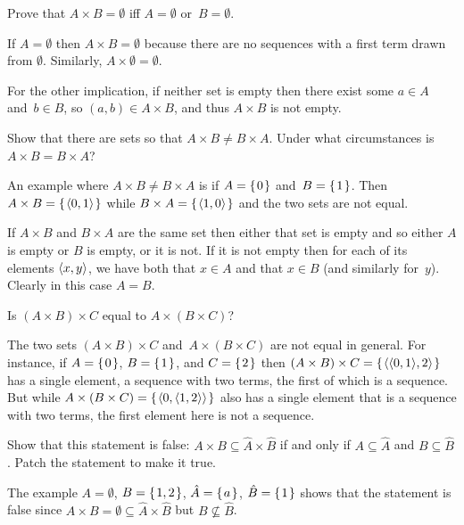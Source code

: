 \documentclass{ibl}  %
\begin{document}
\begin{problem} 
\begin{exes}
\begin{exercise} 
  Prove that $A\times B=\emptyset$ iff $A=\emptyset$ or~$B=\emptyset$.
\end{exercise}
\begin{answer}
  If $A=\emptyset$ then $A\times B=\emptyset$ because there are no 
  sequences with a first term drawn from $\emptyset$.
  Similarly, $A\times\emptyset=\emptyset$.
 
  For the other implication, 
  if neither set is empty then there exist some $a\in A$ and~$b\in B$, so 
  $(a,b)\in A\times B$, and thus $A\times B$ is not empty.  
\end{answer}
\begin{exercise} 
  Show that there are sets so that $A\times B\neq B\times A$.
  Under what circumstances is $A\times B=B\times A$?
\end{exercise}
\begin{answer}
  An example where $A\times B\neq B\times A$ is if 
  $A=\mbox{$\{\hspace{0.1em}0\hspace{0.1em}\}$}$ and~$B=\mbox{$\{\hspace{0.1em}1\hspace{0.1em}\}$}$.
  Then $A\times B=\mbox{$\{\hspace{0.1em}\langle0,1\rangle\hspace{0.1em}\}$}$ while
  $B\times A=\mbox{$\{\hspace{0.1em}\langle1,0\rangle\hspace{0.1em}\}$}$ and the two sets are not equal.

  If $A\times B$ and $B\times A$ are the same set then either that set is empty 
  and so either $A$ is empty or $B$ is empty,
  or it is not.
  If it is not empty then for each of its elements $\langle x,y\rangle$,
  we have both that $x\in A$ and that $x\in B$ (and similarly for~$y$).
  Clearly in this case $A=B$.  
\end{answer}
\begin{exercise} 
  Is $(A\times B)\times C$ equal to $A\times (B\times C)$?
\end{exercise}
\begin{answer}
  The two sets $(A\times B)\times C$ and~$A\times (B\times C)$ 
  are not equal in general.
  For instance, if $A=\mbox{$\{\hspace{0.1em}0\hspace{0.1em}\}$}$, $B=\mbox{$\{\hspace{0.1em}1\hspace{0.1em}\}$}$, and $C=\mbox{$\{\hspace{0.1em}2\hspace{0.1em}\}$}$ then 
  $(A\times B)\times C=\mbox{$\{\hspace{0.1em}\langle\langle0,1\rangle,2\rangle\hspace{0.1em}\}$}$
  has a single element, a sequence with two terms, the first
  of which is a sequence.
  But while $A\times(B\times C)=\mbox{$\{\hspace{0.1em}\langle0,\langle1,2\rangle\rangle\hspace{0.1em}\}$}$ 
  also has a single element that is a sequence with two terms, 
  the first element here is not a sequence. 
% 
\end{answer}
\begin{exercise} 
  Show that this statement is false: 
  $A\times B\subseteq \hat{A}\times \hat{B}$ if and only if
  $A\subseteq \hat{A}$ and $B\subseteq \hat{B}$.
  Patch the statement to make it true.
\end{exercise}
\begin{answer}
  The example 
  $A=\emptyset$, $B=\mbox{$\{\hspace{0.1em}1,2\hspace{0.1em}\}$}$, $\hat{A}=\mbox{$\{\hspace{0.1em}a\hspace{0.1em}\}$}$, $\hat{B}=\mbox{$\{\hspace{0.1em}1\hspace{0.1em}\}$}$
  shows that the statement is false since 
  $A\times B=\emptyset\subseteq \hat{A}\times \hat{B}$ but 
  $B\not\subseteq \hat{B}$.


\end{answer}
\end{exes}
\end{problem}
\end{document}
